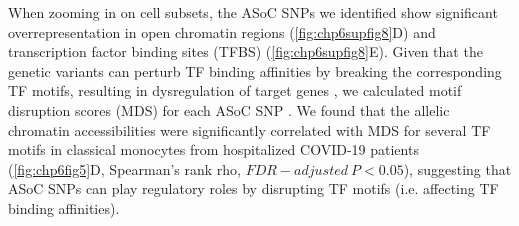 \documentclass{book}
\begin{document}
\begin{refsection}
When zooming in on cell subsets, the ASoC SNPs we identified show significant overrepresentation in open chromatin regions (\ref{fig:chp6supfig8}D) and transcription factor binding sites (TFBS) (\ref{fig:chp6supfig8}E).
Given that the genetic variants can perturb TF binding affinities by breaking the corresponding TF motifs, resulting in dysregulation of target genes \cite{Abramov2021Landscape}, we calculated motif disruption scores (MDS) for each ASoC SNP \cite{Coetzee2015motifbreakR}.
We found that the allelic chromatin accessibilities were significantly correlated with MDS for several TF motifs in classical monocytes from hospitalized COVID-19 patients (\ref{fig:chp6fig5}D, Spearman’s rank rho, $FDR-adjusted~P < 0.05$), suggesting that ASoC SNPs can play regulatory roles by disrupting TF motifs (i.e. affecting TF binding affinities).


\end{refsection}
\end{document}
